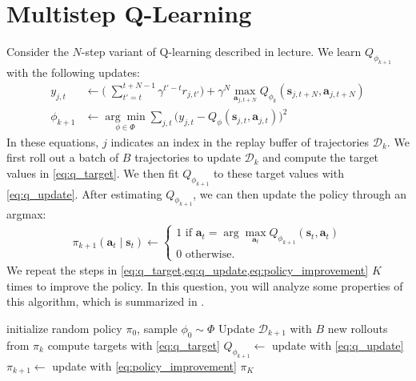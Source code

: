 \section{Multistep Q-Learning}

\ifsolutions

\fi

\def\solve#1{\csname solution to #1\endcsname}

\begingroup
\def\Q{Q_{\phi_k}}
\def\Qn{Q_{\phi_{k+1}}}
\def\D{\mathcal{D}}

Consider the $N$-step variant of Q-learning described in lecture. We learn $\Qn$ with the following updates:
\begin{align}
  y_{j,t} &\gets \biggl(\;\sum_{t'=t}^{t+N-1} \gamma^{t'-t} r_{j,t'}\biggr)+\gamma^{N} \max _{\mathbf{a}_{j,t+N}} \Q\left(\mathbf{s}_{j,t+N}, \mathbf{a}_{j,t+N}\right) \label{eq:q_target} \\
  \phi_{k+1} &\gets \underset{\phi\in\Phi}{\arg\min}  \sum_{j,t} \bigl( y_{j,t}-Q_{\phi}(\mathbf s_{j,t},\mathbf a_{j,t}) \bigr)^2 \label{eq:q_update}
\end{align}
In these equations, $j$ indicates an index in the replay buffer of trajectories $\D_k$. We first roll out a batch of $B$ trajectories to update $\D_k$ and compute the target values in \eqref{eq:q_target}. We then fit $\Qn$ to these target values with \eqref{eq:q_update}. 
After estimating $\Qn$, we can then update the policy through an argmax:\begin{align}
  \pi_{k+1}\left(\mathbf{a}_{t} \mid \mathbf{s}_{t}\right)\gets \left\{\begin{array}{l}1 \text { if } \mathbf{a}_{t}=\arg \max _{\mathbf{a}_{t}} Q_{\phi_{k+1}}\left(\mathbf{s}_{t}, \mathbf{a}_{t}\right) \\ 0 \text{ otherwise. }\end{array}\right. \label{eq:policy_improvement}
\end{align}
We repeat the steps in \cref{eq:q_target,eq:q_update,eq:policy_improvement} $K$ times to improve the policy. In this question, you will analyze some properties of this algorithm, which is summarized in .

\begin{algorithm}
\caption{Multistep Q-Learning}
\label{alg:multi}
\begin{algorithmic}[1]
	\State initialize random policy $\pi_0$, sample $\phi_0\sim\Phi$
		\State Update $\D_{k+1}$ with $B$ new rollouts from $\pi_k$ \label{eq:data}
		\State compute targets with \eqref{eq:q_target}
		\State $Q_{\phi_{k+1}} \gets$ update with \eqref{eq:q_update}
		\State $\pi_{k+1} \gets$ update with \eqref{eq:policy_improvement}
	\EndFor
	\State\Return $\pi_{K}$
\end{algorithmic}	
\end{algorithm}



